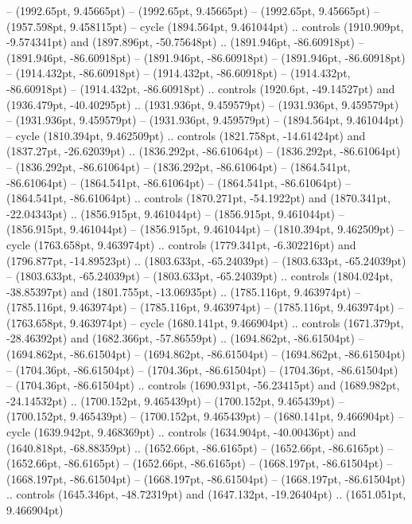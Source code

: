  -- (1992.65pt, 9.45665pt)
 -- (1992.65pt, 9.45665pt)
 -- (1992.65pt, 9.45665pt)
 -- (1957.598pt, 9.458115pt) -- cycle
(1894.564pt, 9.461044pt) .. controls (1910.909pt, -9.574341pt) and (1897.896pt, -50.75648pt) .. (1891.946pt, -86.60918pt)
 -- (1891.946pt, -86.60918pt)
 -- (1891.946pt, -86.60918pt)
 -- (1891.946pt, -86.60918pt)
 -- (1914.432pt, -86.60918pt)
 -- (1914.432pt, -86.60918pt)
 -- (1914.432pt, -86.60918pt)
 -- (1914.432pt, -86.60918pt) .. controls (1920.6pt, -49.14527pt) and (1936.479pt, -40.40295pt) .. (1931.936pt, 9.459579pt)
 -- (1931.936pt, 9.459579pt)
 -- (1931.936pt, 9.459579pt)
 -- (1931.936pt, 9.459579pt)
 -- (1894.564pt, 9.461044pt) -- cycle
(1810.394pt, 9.462509pt) .. controls (1821.758pt, -14.61424pt) and (1837.27pt, -26.62039pt) .. (1836.292pt, -86.61064pt)
 -- (1836.292pt, -86.61064pt)
 -- (1836.292pt, -86.61064pt)
 -- (1836.292pt, -86.61064pt)
 -- (1864.541pt, -86.61064pt)
 -- (1864.541pt, -86.61064pt)
 -- (1864.541pt, -86.61064pt)
 -- (1864.541pt, -86.61064pt) .. controls (1870.271pt, -54.1922pt) and (1870.341pt, -22.04343pt) .. (1856.915pt, 9.461044pt)
 -- (1856.915pt, 9.461044pt)
 -- (1856.915pt, 9.461044pt)
 -- (1856.915pt, 9.461044pt)
 -- (1810.394pt, 9.462509pt) -- cycle
(1763.658pt, 9.463974pt) .. controls (1779.341pt, -6.302216pt) and (1796.877pt, -14.89523pt) .. (1803.633pt, -65.24039pt)
 -- (1803.633pt, -65.24039pt)
 -- (1803.633pt, -65.24039pt)
 -- (1803.633pt, -65.24039pt) .. controls (1804.024pt, -38.85397pt) and (1801.755pt, -13.06935pt) .. (1785.116pt, 9.463974pt)
 -- (1785.116pt, 9.463974pt)
 -- (1785.116pt, 9.463974pt)
 -- (1785.116pt, 9.463974pt)
 -- (1763.658pt, 9.463974pt) -- cycle
(1680.141pt, 9.466904pt) .. controls (1671.379pt, -28.46392pt) and (1682.366pt, -57.86559pt) .. (1694.862pt, -86.61504pt)
 -- (1694.862pt, -86.61504pt)
 -- (1694.862pt, -86.61504pt)
 -- (1694.862pt, -86.61504pt)
 -- (1704.36pt, -86.61504pt)
 -- (1704.36pt, -86.61504pt)
 -- (1704.36pt, -86.61504pt)
 -- (1704.36pt, -86.61504pt) .. controls (1690.931pt, -56.23415pt) and (1689.982pt, -24.14532pt) .. (1700.152pt, 9.465439pt)
 -- (1700.152pt, 9.465439pt)
 -- (1700.152pt, 9.465439pt)
 -- (1700.152pt, 9.465439pt)
 -- (1680.141pt, 9.466904pt) -- cycle
(1639.942pt, 9.468369pt) .. controls (1634.904pt, -40.00436pt) and (1640.818pt, -68.88359pt) .. (1652.66pt, -86.6165pt)
 -- (1652.66pt, -86.6165pt)
 -- (1652.66pt, -86.6165pt)
 -- (1652.66pt, -86.6165pt)
 -- (1668.197pt, -86.61504pt)
 -- (1668.197pt, -86.61504pt)
 -- (1668.197pt, -86.61504pt)
 -- (1668.197pt, -86.61504pt) .. controls (1645.346pt, -48.72319pt) and (1647.132pt, -19.26404pt) .. (1651.051pt, 9.466904pt)
